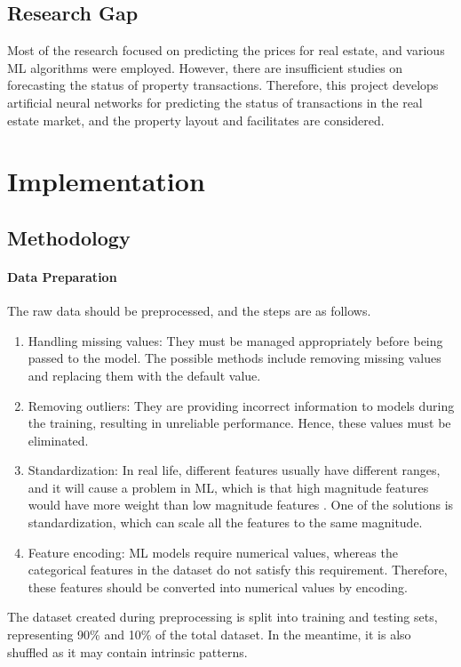 \documentclass[12pt,twoside]{report}
\begin{document}
\section{Research Gap}
Most of the research focused on predicting the prices for real estate, and various ML algorithms were employed. However, there are insufficient studies on forecasting the status of property transactions. Therefore, this project develops artificial neural networks for predicting the status of transactions in the real estate market, and the property layout and facilitates are considered. 

\chapter{Implementation}

\section{Methodology}
\subsubsection{Data Preparation}
The raw data should be preprocessed, and the steps are as follows. 
\begin{enumerate}
	\item Handling missing values: They must be managed appropriately before being passed to the model. The possible methods include removing missing values and replacing them with the default value.
	\item Removing outliers: They are providing incorrect information to models during the training, resulting in unreliable performance. Hence, these values must be eliminated.
	\item Standardization: In real life, different features usually have different ranges, and it will cause a problem in ML, which is that high magnitude features would have more weight than low magnitude features \citep{RN4}. One of the solutions is standardization, which can scale all the features to the same magnitude.
	\item Feature encoding: ML models require numerical values, whereas the categorical features in the dataset do not satisfy this requirement. Therefore, these features should be converted into numerical values by encoding.
\end{enumerate}

The dataset created during preprocessing is split into training and testing sets, representing 90\% and 10\% of the total dataset. In the meantime, it is also shuffled as it may contain intrinsic patterns.
\end{document}
